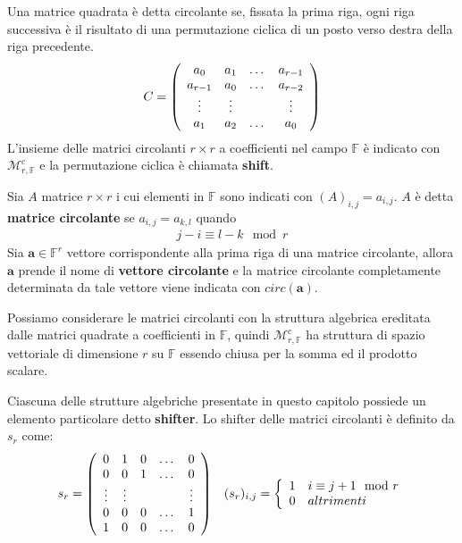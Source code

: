 Una matrice quadrata è detta circolante se, fissata la prima riga, ogni riga successiva è il risultato di una permutazione ciclica di un posto verso destra della riga precedente.  
\begin{align*}
C = 
\left(
\begin{array} {c c c c }
a_0 & a_1 & \dots & a_{r-1}   \\
a_{r-1} & a_0 & \dots & a_{r-2}   \\
\vdots & \vdots &  & \vdots   \\
a_{1} & a_2 & \dots & a_{0}   \\       
\end{array}
\right)
\end{align*}
L'insieme delle matrici circolanti $r\times r$ a coefficienti nel campo $\mathbb{F}$ è indicato con $\mathcal{M}_{r,\mathbb{F} }^{c}$ e la permutazione ciclica è chiamata {\bf shift}.
\begin{definizione}
Sia $A$ matrice $r \times r$ i cui elementi in $\mathbb{F}$ sono indicati con $(A)_{i,j} = a_{i,j}$. $A$ è
detta {\bf matrice circolante} se  $a_{i,j} = a_{k,l}$ quando 
\begin{align*}
   j-i \equiv l-k \mod{r}
\end{align*}
Sia $\mathbf{a} \in \mathbb{F}^{r}$ vettore corrispondente alla
prima riga di una matrice circolante, allora $\mathbf{a}$ prende il nome di {\bf
vettore circolante} e la matrice circolante completamente determinata da tale
vettore viene indicata con $circ(\mathbf{a})$.  
\end{definizione}

\noindent
Possiamo considerare le matrici circolanti con la struttura algebrica
ereditata
dalle matrici quadrate a coefficienti in $\mathbb{F}$,
quindi $\mathcal{M}_{r,\mathbb{F} }^{c}$ ha struttura di spazio vettoriale di
dimensione $r$ su $\mathbb{F}$ essendo chiusa per la somma ed il prodotto scalare. 

Ciascuna delle strutture algebriche presentate in questo capitolo possiede un
elemento particolare detto {\bf shifter}. Lo shifter delle matrici circolanti è
definito da $s_r$ come:
\begin{align*}
s_r = 
\left(
\begin{array} {c c c c c }
0 & 1 & 0 & \dots & 0   \\
0 & 0 & 1 & \dots & 0   \\
\vdots & \vdots &  & & \vdots   \\
0 & 0 & 0 & \dots & 1   \\
1 & 0 & 0 & \dots & 0   \\     
\end{array}
\right)
&
&
(s_r)_{i,j} =  
\left\lbrace
\begin{array} {c l}
1 & i \equiv j+1 \mod{r}  \\
0 & altrimenti       
\end{array}
\right.
\end{align*}

